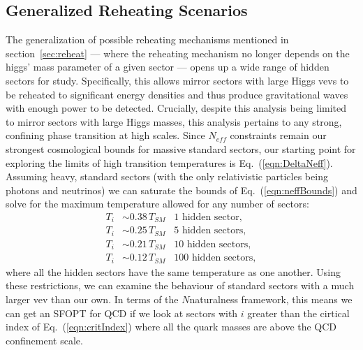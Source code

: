 \documentclass[nofootinbib,twocolumn,preprintnumbers]{revtex4-1}
\begin{document}
\subsection{Generalized Reheating Scenarios}
The generalization of possible reheating mechanisms mentioned in section~\ref{sec:reheat} --- where the reheating mechanism no longer depends on the higgs' mass parameter of a given sector --- opens up a wide range of hidden sectors for study. Specifically, this allows mirror sectors with large Higgs vevs to be reheated to significant energy densities and thus produce gravitational waves with enough power to be detected. Crucially, despite this analysis being limited to mirror sectors with large Higgs masses, this analysis pertains to any strong, confining phase transition at high scales.
Since $N_{eff}$ constraints remain our strongest cosmological bounds for massive standard sectors, our starting point for exploring the limits of high transition temperatures is Eq.~(\ref{eqn:DeltaNeff}). Assuming heavy, standard sectors (with the only relativistic particles being photons and neutrinos) we can saturate the bounds of Eq.~(\ref{eqn:neffBounds}) and solve for the maximum temperature allowed for any number of sectors:
\begin{equation}\label{eqn:energyDensityAllowed}
\begin{split}
T_i &\sim 0.38 \,T_{SM} \,\,\,\,\, \mathrm{1}\,\, \mathrm{hidden}\,\, \mathrm{sector},
\\
T_i &\sim 0.25 \,T_{SM} \,\,\,\,\, \mathrm{5} \,\,\mathrm{hidden}\,\, \mathrm{sectors},
\\
T_i &\sim 0.21 \,T_{SM} \,\,\,\,\, \mathrm{10} \,\,\mathrm{hidden}\,\, \mathrm{sectors},
\\
T_i &\sim 0.12 \,T_{SM} \,\,\,\,\, \mathrm{100} \,\,\mathrm{hidden}\,\, \mathrm{sectors},
\end{split}
\end{equation}
where all the hidden sectors have the same temperature as one another.
Using these restrictions, we can examine the behaviour of standard sectors with a much larger vev than our own. In terms of the $N$naturalness framework, this means we can get an SFOPT for QCD if we look at sectors with $i$ greater than the cirtical index of Eq.~(\ref{eqn:critIndex}) where all the quark masses are above the QCD confinement scale. 
\end{document}
